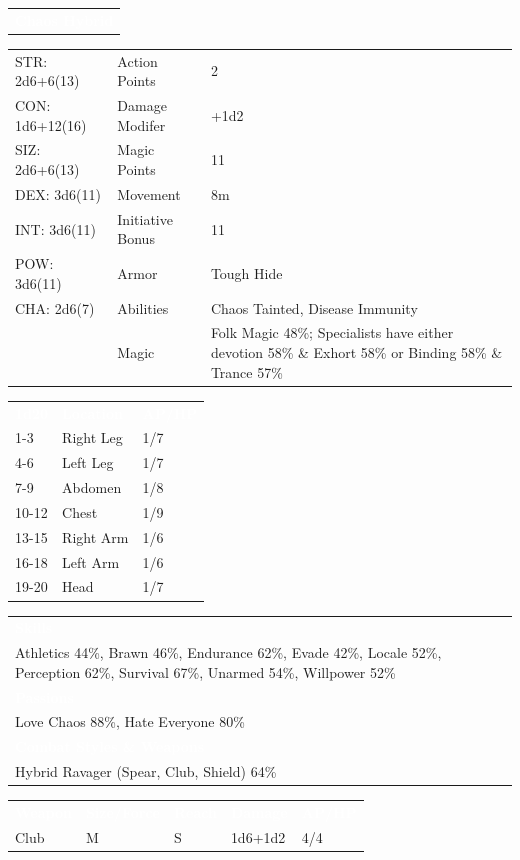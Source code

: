 \documentclass[letterpaper,serif]{rpg-module}
\begin{document}
\begin{tabularx}{\linewidth}{X}
\rowcolor{gray}
\textcolor{white}{\textbf{Chaos Hybrid}}
\end{tabularx}
\begin{tabularx}{\linewidth}{XXX}
STR: 2d6+6(13) & Action Points & 2 \\
CON: 1d6+12(16) & Damage Modifer & +1d2 \\
SIZ: 2d6+6(13) & Magic Points & 11 \\
DEX: 3d6(11) & Movement & 8m \\
INT: 3d6(11) & Initiative Bonus & 11 \\
POW: 3d6(11) & Armor & Tough Hide \\
CHA: 2d6(7) & Abilities & Chaos Tainted, Disease Immunity \\
    & Magic & Folk Magic 48\%; Specialists have either devotion 58\% \& Exhort 58\% or Binding 58\% \& Trance 57\%
\end{tabularx}
\begin{tabularx}{\linewidth}{XXX}
\rowcolor{gray}
\textcolor{white}{\textbf{1d20}} & \textcolor{white}{\textbf{Location}} & \textcolor{white}{\textbf{AP/HP}} \\
1-3 & Right Leg & 1/7 \\
4-6 & Left Leg & 1/7 \\
7-9 & Abdomen & 1/8 \\
10-12 & Chest & 1/9 \\
13-15 & Right Arm & 1/6 \\
16-18 & Left Arm & 1/6 \\
19-20 & Head & 1/7 
\end{tabularx}
\begin{tabularx}{\linewidth}{X}
\rowcolor{gray}
\textcolor{white}{\textbf{Skills}} \\
Athletics 44\%, Brawn 46\%, Endurance 62\%, Evade 42\%, Locale 52\%, Perception 62\%, Survival 67\%, Unarmed 54\%, Willpower 52\%\\
\rowcolor{gray}
\textcolor{white}{\textbf{Passions}} \\
Love Chaos 88\%, Hate Everyone 80\% \\
\rowcolor{gray}
\textcolor{white}{\textbf{Combat Styles \& Weapons}} \\
Hybrid Ravager (Spear, Club, Shield) 64\%
\end{tabularx}
\begin{tabularx}{\linewidth}{XXXXX}
\rowcolor{gray}
\textcolor{white}{\textbf{Weapon}} & \textcolor{white}{\textbf{Size/Force}} & \textcolor{white}{\textbf{Reach}} & \textcolor{white}{\textbf{Damage}} & \textcolor{white}{\textbf{AP/HP}} \\
Club & M & S & 1d6+1d2 & 4/4
\end{tabularx}
\end{document}
